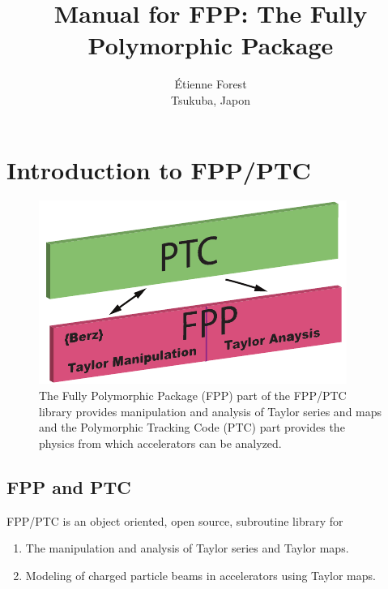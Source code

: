 \documentclass[english,12pt,article]{article} %
\title{ \protect \large Manual for FPP:   The Fully Polymorphic Package}
\author{Étienne Forest \\ Tsukuba, Japon }
\begin{document}
 
\maketitle

\newpage 
{\footnotesize
\tableofcontents %
}
\newpage 

\section{Introduction to FPP/PTC}
\label{sec:fppptc}

\begin{figure}[tb]
  \centering
  \includegraphics{FPP-PTC.pdf}
  \caption{The Fully Polymorphic Package (FPP) part of the FPP/PTC library provides manipulation and analysis of Taylor series and maps and the Polymorphic Tracking Code (PTC) part provides the physics from which accelerators can be analyzed.}
  \label{f:fpp-ptc}
\end{figure}

\subsection{FPP and PTC}

FPP/PTC is an object oriented, open source, subroutine library for
\begin{enumerate}[itemsep=-0.5ex, topsep=-0.4ex]
\item The manipulation and analysis of Taylor series and Taylor maps.
\item Modeling of charged particle beams in accelerators using Taylor maps.
\end{enumerate}
\end{document}
